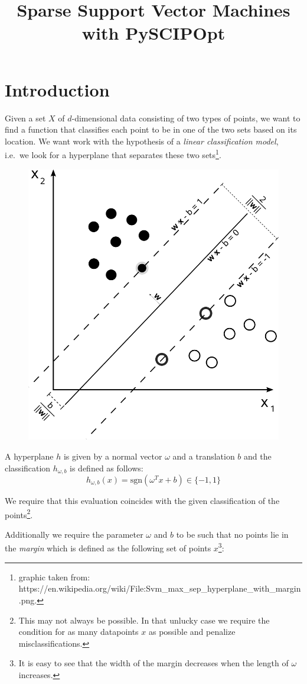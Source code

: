 \documentclass[11pt]{article}
\title{Sparse Support Vector Machines with PySCIPOpt}
\begin{document}
\maketitle

\section*{Introduction}

Given a set $X$ of $d$-dimensional data consisting of two types of points, we want to find a function that classifies each point to be in one of the two sets based on its location.
We want work with the hypothesis of a \emph{linear classification model}, i.e.\ we look for a hyperplane that separates these two sets\footnote{graphic taken from: https://en.wikipedia.org/wiki/File:Svm\_max\_sep\_hyperplane\_with\_margin.png.}.

\begin{figure}
  \includegraphics[width=.5\textwidth, keepaspectratio]{img/svm_max_sep_hyperplane.png}
\end{figure}

A hyperplane $h$ is given by a normal vector $\omega$ and a translation $b$ and the classification $h_{\omega, b}$ is defined as follows:
$$ h_{\omega, b}(x) = \text{sgn} (\omega^{T}x + b) \in \{-1, 1\}$$

We require that this evaluation coincides with the given classification of the points\footnote{
This may not always be possible.
In that unlucky case we require the condition for as many datapoints $x$ as possible and penalize misclassifications.}.


Additionally we require the parameter $\omega$ and $b$ to be such that no points lie in the \emph{margin} which is defined as the following set of points $x$\footnote{
It is easy to see that the width of the margin decreases when the length of $\omega$ increases.}:
\end{document}
